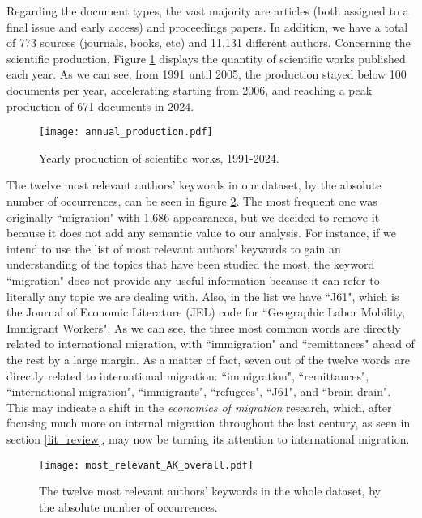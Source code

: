 Regarding the document types, the vast majority are articles (both assigned to a final issue and early access) and proceedings papers. In addition, we have a total of 773 sources (journals, books, etc) and 11,131 different authors. Concerning the scientific production, Figure \ref{fig:annual_production} displays the quantity of scientific works published each year. As we can see, from 1991 until 2005, the production stayed below 100 documents per year, accelerating starting from 2006, and reaching a peak production of 671 documents in 2024.

\begin{figure}[!ht]
	\centering
	\texttt{[image: annual\_production.pdf]}
	\caption{Yearly production of scientific works, 1991-2024.}
	\label{fig:annual_production}
\end{figure}

The twelve most relevant authors' keywords in our dataset, by the absolute number of occurrences, can be seen in figure \ref{fig:most_relevant_AK}. The most frequent one was originally ``migration" with 1,686 appearances, but we decided to remove it because it does not add any semantic value to our analysis. For instance, if we intend to use the list of most relevant authors' keywords to gain an understanding of the topics that have been studied the most, the keyword ``migration" does not provide any useful information because it can refer to literally any topic we are dealing with. Also, in the list we have ``J61", which is the Journal of Economic Literature (JEL) code for ``Geographic Labor Mobility, Immigrant Workers". As we can see, the three most common words are directly related to international migration, with ``immigration" and ``remittances" ahead of the rest by a large margin. As a matter of fact, seven out of the twelve words are directly related to international migration: ``immigration", ``remittances", ``international migration", ``immigrants", ``refugees", ``J61", and ``brain drain". This may indicate a shift in the \textit{economics of migration} research, which, after focusing much more on internal migration throughout the last century, as seen in section \ref{lit_review}, may now be turning its attention to international migration.

\begin{figure}[!ht]
	\centering
	\texttt{[image: most\_relevant\_AK\_overall.pdf]}
	\caption{The twelve most relevant authors' keywords in the whole dataset, by the absolute number of occurrences.}
	\label{fig:most_relevant_AK}
\end{figure}

